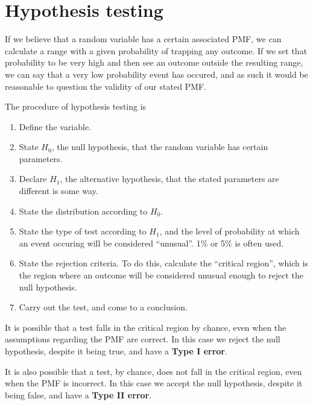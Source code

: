 \documentclass[a5paper]{article}
\begin{document}
\section{Hypothesis testing}

If we believe that a random variable has a certain associated PMF, we can
calculate a range with a given probability of trapping any outcome. If we set
that probability to be very high and then see an outcome outside the resulting
range, we can say that a very low probability event has occured, and as such it
would be reasonable to question the validity of our stated PMF.

The procedure of hypothesis testing is
\begin{enumerate}
  \item Define the variable.
\item State $H_0$, the null hypothesis, that the random variable has certain
  parameters.
\item Declare $H_1$, the alternative hypothesis, that the stated parameters are
  different is some way.
\item State the distribution according to $H_0$.
\item State the type of test according to $H_1$, and the level of probability
  at which an event occuring will be considered ``unusual''. 1\% or 5\% is
  often used.
\item State the rejection criteria. To do this, calculate the ``critical
  region'', which is the region where an outcome will be considered unusual
  enough to reject the null hypothesis.
\item Carry out the test, and come to a conclusion.
\end{enumerate}

It is possible that a test falls in the critical region by chance, even when the
assumptions regarding the PMF are correct. In this case we reject the null
hypothesis, despite it being true, and have a \textbf{Type I error}.

It is also possible that a test, by chance, does not fall in the critical
region, even when the PMF is incorrect. In this case we accept the null
hypothesis, despite it being false, and have a \textbf{Type II error}.
\end{document}
